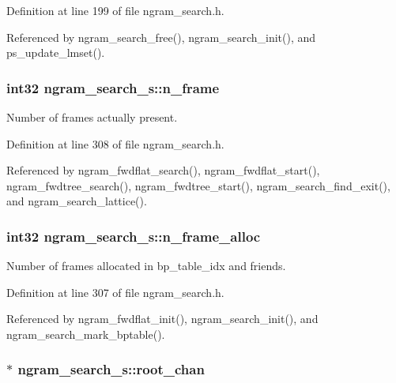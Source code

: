 Definition at line 199 of file ngram\-\_\-search.\-h.



Referenced by ngram\-\_\-search\-\_\-free(), ngram\-\_\-search\-\_\-init(), and ps\-\_\-update\-\_\-lmset().

\subsubsection[{n\-\_\-frame}]{\setlength{\rightskip}{0pt plus 5cm}int32 ngram\-\_\-search\-\_\-s\-::n\-\_\-frame}\label{structngram__search__s_a5255e56d28c239a4e1d9b1721e8a2f8d}


Number of frames actually present. 



Definition at line 308 of file ngram\-\_\-search.\-h.



Referenced by ngram\-\_\-fwdflat\-\_\-search(), ngram\-\_\-fwdflat\-\_\-start(), ngram\-\_\-fwdtree\-\_\-search(), ngram\-\_\-fwdtree\-\_\-start(), ngram\-\_\-search\-\_\-find\-\_\-exit(), and ngram\-\_\-search\-\_\-lattice().

\subsubsection[{n\-\_\-frame\-\_\-alloc}]{\setlength{\rightskip}{0pt plus 5cm}int32 ngram\-\_\-search\-\_\-s\-::n\-\_\-frame\-\_\-alloc}\label{structngram__search__s_a38ea5de504b3d7ad2390a3f8966d502f}


Number of frames allocated in bp\-\_\-table\-\_\-idx and friends. 



Definition at line 307 of file ngram\-\_\-search.\-h.



Referenced by ngram\-\_\-fwdflat\-\_\-init(), ngram\-\_\-search\-\_\-init(), and ngram\-\_\-search\-\_\-mark\-\_\-bptable().

\subsubsection[{root\-\_\-chan}]{$\ast$ ngram\-\_\-search\-\_\-s\-::root\-\_\-chan}\label{structngram__search__s_ae1b0a51cfcddc1e4b6ac94fa1e48887a}



